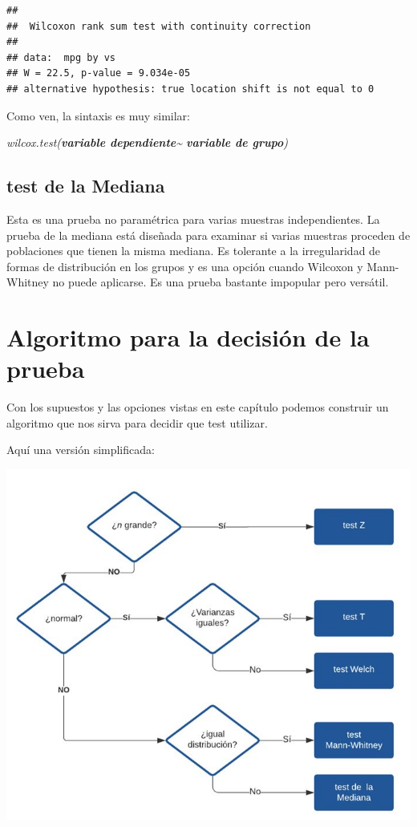 \documentclass[
]{book}
\begin{document}
\begin{verbatim}
## 
##  Wilcoxon rank sum test with continuity correction
## 
## data:  mpg by vs
## W = 22.5, p-value = 9.034e-05
## alternative hypothesis: true location shift is not equal to 0
\end{verbatim}

Como ven, la sintaxis es muy similar:

\emph{wilcox.test(\textbf{variable dependiente}\textasciitilde{} \textbf{variable de grupo})}

\hypertarget{test-de-la-mediana}{%
\subsection{test de la Mediana}\label{test-de-la-mediana}}

Esta es una prueba no paramétrica para varias muestras independientes. La prueba de la mediana está diseñada para examinar si varias muestras proceden de poblaciones que tienen la misma mediana.
Es tolerante a la irregularidad de formas de distribución en los grupos y es una opción cuando Wilcoxon y Mann-Whitney no puede aplicarse. Es una prueba bastante impopular pero versátil.

\hypertarget{algoritmo-para-la-decisiuxf3n-de-la-prueba}{%
\section{Algoritmo para la decisión de la prueba}\label{algoritmo-para-la-decisiuxf3n-de-la-prueba}}

Con los supuestos y las opciones vistas en este capítulo podemos construir un algoritmo que nos sirva para decidir que test utilizar.

Aquí una versión simplificada:

\includegraphics[width=9.64in]{img/algo}
\end{document}
